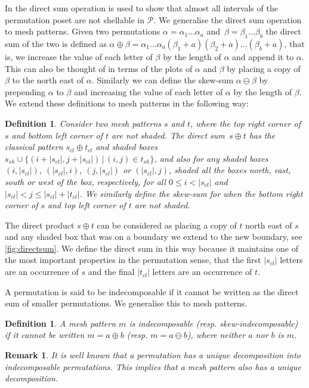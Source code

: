 \documentclass[preprint,11pt]{elsarticle}
\newtheorem{defn}[thm]{Definition}\crefname{defn}{Definition}{Definitions}
\newtheorem{rem}[thm]{Remark}\crefname{rem}{Remark}{Remarks}
\newcommand\cl[1]{#1_{cl}}
\newcommand\sh[1]{#1_{sh}}
\numberwithin{equation}{section}
\numberwithin{figure}{section}
\numberwithin{thm}{section}
\begin{document}
In \cite{McSt13} the direct sum operation is used to show that almost all
intervals of the permutation poset are not shellable in $\mathcal{P}$. We generalise the direct sum operation to
mesh patterns. Given two permutations $\alpha=\alpha_1\ldots\alpha_a$
and~$\beta=\beta_1\ldots\beta_b$ the direct sum of the two is defined as
$\alpha\oplus\beta=\alpha_1\ldots\alpha_a(\beta_1+a)(\beta_2+a)\ldots(\beta_b+a)$,
that is, we increase the value of each letter of $\beta$ by the
length of $\alpha$ and append it to $\alpha$. This can also be thought of in terms of the plots of $\alpha$
and $\beta$ by placing a copy of $\beta$ to the north east of $\alpha$.
Similarly we can define the skew-sum $\alpha\ominus\beta$ by
prepending $\alpha$ to $\beta$ and increasing the value of each letter of $\alpha$
by the length of $\beta$. We extend these definitions to mesh patterns in the following way:

\begin{defn}\label{defn:directsum}
Consider two mesh patterns $s$ and $t$, where the top right corner of $s$
and bottom left corner of $t$ are not shaded. The direct sum~$s\oplus t$ has the classical pattern
$\cl{s}\oplus\cl{t}$ and shaded boxes $\sh{s}\cup\{(i+|\cl{s}|,j+|\cl{s}|)\,|\,(i,j)\in\sh{t}\}$,
and also for any shaded boxes $(i,|\cl{s}|)$, $(|\cl{s}|,i)$, $(j,|\cl{s}|)$ or $(|\cl{s}|,j)$,
shaded all the boxes north, east, south or west of the box, respectively,
for all $0\le i< |\cl{s}|$ and $|\cl{s}|< j\le |\cl{s}|+|\cl{t}|$.  We similarly
define the skew-sum for when the bottom right corner of $s$ and top left corner of $t$ are not shaded.
\end{defn}

The direct product $s\oplus t$ can be considered as placing a copy of $t$
north east of $s$ and any shaded box that was on a boundary we extend to the new boundary,
see \cref{fig:directsum}. We define the direct sum in this way because it maintains one of the most
important properties in the permutation sense, that the first $|\cl{s}|$ letters are
an occurrence of $s$ and the final $|\cl{t}|$ letters are an occurrence of $t$.

A permutation is said to be indecomposable if it cannot be written as the direct
sum of smaller permutations. We generalise this to mesh patterns.
\begin{defn}
A mesh pattern $m$ is \emph{indecomposable} (resp. \emph{skew-\linebreak indecomposable}) if it
cannot be written $m=a\oplus b$ (resp. $m=a\ominus b$), where neither $a$ nor $b$ is $m$.
\end{defn}
\begin{rem}
It is well known that a permutation has a unique decomposition into indecomposable permutations.
This implies that a mesh pattern also has a unique decomposition.
\end{rem}
\end{document}
